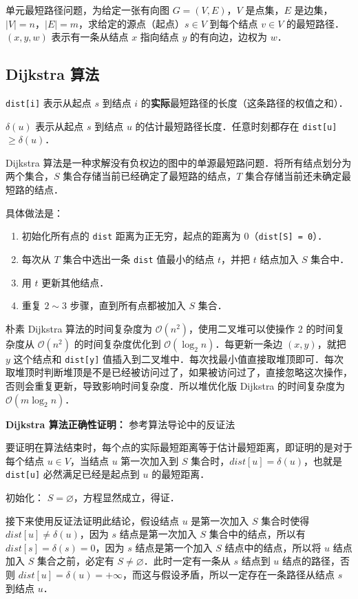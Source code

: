 
单元最短路径问题，为给定一张有向图 $G = (V, E)$，$V$ 是点集，$E$ 是边集，$|V|= n$，$|E| = m$，求给定的源点（起点）$s \in V$ 到每个结点 $v \in V$ 的最短路径．$(x, y, w)$ 表示有一条从结点 $x$ 指向结点 $y$ 的有向边，边权为 $w$．

\subsection{Dijkstra 算法}

\verb|dist[i]| 表示从起点 $s$ 到结点 $i$ 的\textbf{实际}最短路径的长度（这条路径的权值之和）．

$\delta(u)$ 表示从起点 $s$ 到结点 $u$ 的估计最短路径长度．任意时刻都存在 \verb|dist[u]| $\geq \delta(u)$．

Dijkstra 算法是一种求解没有负权边的图中的单源最短路问题．将所有结点划分为两个集合，$S$ 集合存储当前已经确定了最短路的结点，$T$ 集合存储当前还未确定最短路的结点．

具体做法是：
\begin{enumerate}
\item 初始化所有点的 \verb|dist| 距离为正无穷，起点的距离为 $0$（\verb|dist[S] = 0|）．
\item 每次从 $T$ 集合中选出一条 \verb|dist| 值最小的结点 $t$，并把 $t$ 结点加入 $S$ 集合中．
\item 用 $t$ 更新其他结点．
\item 重复 $2 \sim 3$ 步骤，直到所有点都被加入 $S$ 集合．
\end{enumerate}

朴素 Dijkstra 算法的时间复杂度为 $\mathcal{O}(n^2)$，使用二叉堆可以使操作 $2$ 的时间复杂度从 $\mathcal{O}(n^2)$ 的时间复杂度优化到 $\mathcal{O}(\log_2 n)$．每更新一条边 $(x, y)$，就把 $y$ 这个结点和 \verb|dist[y]| 值插入到二叉堆中．每次找最小值直接取堆顶即可．每次取堆顶时判断堆顶是不是已经被访问过了，如果被访问过了，直接忽略这次操作，否则会重复更新，导致影响时间复杂度．所以堆优化版 Dijkstra 的时间复杂度为 $\mathcal{O}(m \log_2 n)$．

\textbf{Dijkstra 算法正确性证明：}
参考算法导论中的反证法

要证明在算法结束时，每个点的实际最短距离等于估计最短距离，即证明的是对于每个结点 $u \in V$，当结点 $u$ 第一次加入到 $S$ 集合时，$dist[u] =\delta(u)$，也就是 \verb|dist[u]| 必然满足已经是起点到 $u$ 的最短距离．

初始化： $S = \varnothing$，方程显然成立，得证．

接下来使用反证法证明此结论，假设结点 $u$ 是第一次加入 $S$ 集合时使得 $dist[u] \neq \delta(u)$，因为 $s$ 结点是第一次加入 $S$ 集合中的结点，所以有 $dist[s] = \delta(s) = 0$，因为 $s$ 结点是第一个加入 $S$ 结点中的结点，所以将 $u$ 结点加入 $S$ 集合之前，必定有 $S \neq \varnothing$．此时一定有一条从 $s$ 结点到 $u$ 结点的路径，否则 $dist[u] = \delta(u) = +\infty$，而这与假设矛盾，所以一定存在一条路径从结点 $s$ 到结点 $u$．

